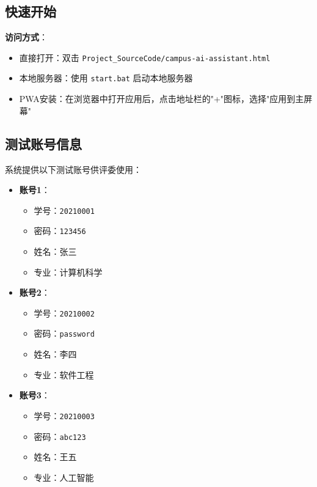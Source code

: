 \documentclass[12pt,a4paper]{article}
\begin{document}
\subsection{快速开始}

\textbf{访问方式}：
\begin{itemize}
    \item 直接打开：双击 \texttt{Project\_SourceCode/campus-ai-assistant.html}
    \item 本地服务器：使用 \texttt{start.bat} 启动本地服务器
    \item PWA安装：在浏览器中打开应用后，点击地址栏的"+"图标，选择"应用到主屏幕"
\end{itemize}

\subsection{测试账号信息}

系统提供以下测试账号供评委使用：

\begin{itemize}
    \item \textbf{账号1}：
    \begin{itemize}
        \item 学号：\texttt{20210001}
        \item 密码：\texttt{123456}
        \item 姓名：张三
        \item 专业：计算机科学
    \end{itemize}
    
    \item \textbf{账号2}：
    \begin{itemize}
        \item 学号：\texttt{20210002}
        \item 密码：\texttt{password}
        \item 姓名：李四
        \item 专业：软件工程
    \end{itemize}
    
    \item \textbf{账号3}：
    \begin{itemize}
        \item 学号：\texttt{20210003}
        \item 密码：\texttt{abc123}
        \item 姓名：王五
        \item 专业：人工智能
    \end{itemize}
\end{itemize}
\end{document}
